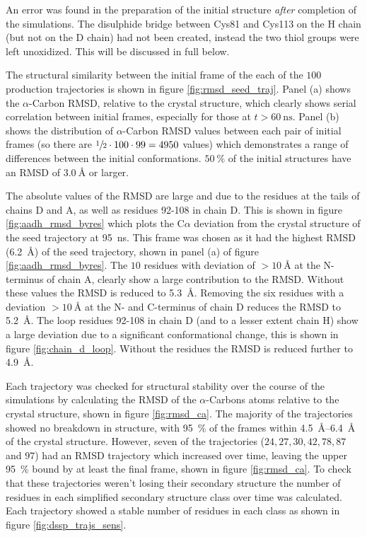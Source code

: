 An error was found in the preparation of the initial structure \emph{after} completion of the simulations. The disulphide bridge between Cys81 and Cys113 on the H chain (but not on the D chain) had not been created, instead the two thiol groups were left unoxidized. This will be discussed in full below. 

 The structural similarity between the initial frame of the each of the $100$ production trajectories is shown in figure \ref{fig:rmsd_seed_traj}. Panel (a) shows the $\alpha$-Carbon RMSD, relative to the crystal structure, which clearly shows serial correlation between initial frames, especially for those at $t>\SI{60}{\nano\second}$.  Panel (b) shows the distribution of $\alpha$-Carbon RMSD values between each pair of initial frames (so there are $\sfrac{1}{2}\cdot 100\cdot 99 = 4950$ values) which demonstrates a range of differences between the initial conformations. $\SI{50}{\percent}$ of the initial structures have an RMSD of $\SI{3.0}{\angstrom}$ or larger.  
 
 The absolute values of the RMSD are large and due to the residues at the tails of chains D and A, as well as residues 92-108 in chain D. This is shown in figure \ref{fig:aadh_rmsd_byres} which plots the C$\alpha$ deviation from the crystal structure of the seed trajectory at \SI{95}{\nano\second}. This frame was chosen as it had the highest RMSD (\SI{6.2}{\angstrom}) of the seed trajectory, shown in panel (a) of figure \ref{fig:aadh_rmsd_byres}. The $10$ residues with deviation of $>\SI{10}{\angstrom}$ at the N-terminus of chain A, clearly show a large contribution to the RMSD. Without these values the RMSD is reduced to \SI{5.3}{\angstrom}. Removing the six residues with a deviation $> \SI{10}{\angstrom}$  at the N- and C-terminus of chain D reduces the RMSD to \SI{5.2}{\angstrom}. The loop residues 92-108 in chain D (and to a lesser extent chain H) show a large deviation due to a significant conformational change, this is shown in figure \ref{fig:chain_d_loop}. Without the residues the RMSD is reduced further to  \SI{4.9}{\angstrom}. 

Each trajectory was checked for structural stability over the course of the simulations by calculating the RMSD of the $\alpha$-Carbons atoms relative to the crystal structure, shown in figure \ref{fig:rmsd_ca}. The majority of the trajectories showed no breakdown in structure, with  \SI{95}{\percent} of the frames within \SIrange{4.5}{6.4}{\angstrom} of the crystal structure. However, seven of the trajectories ($24, 27, 30, 42, 78, 87$ and $97$) had an RMSD trajectory which increased over time, leaving the upper \SI{95}{\percent} bound by at least the final frame, shown in figure \ref{fig:rmsd_ca}. To check that these trajectories weren't losing their secondary structure the number of residues in each simplified secondary structure class \cite{kabschDictionaryProteinSecondary1983} over time was calculated. Each trajectory showed a stable number of residues in each class as shown in figure \ref{fig:dssp_trajs_sens}.

